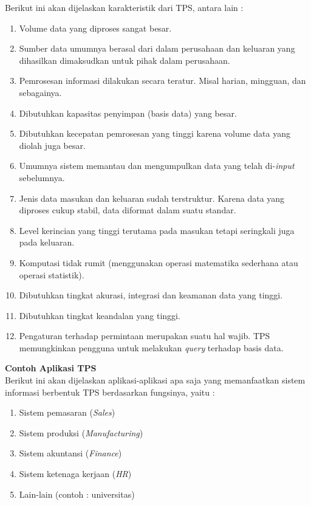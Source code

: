 Berikut ini akan dijelaskan karakteristik dari TPS, antara lain \cite{Turban:2001} : 
\begin{enumerate}
	\item Volume data yang diproses sangat besar.
	\item Sumber data umumnya berasal dari dalam perusahaan dan keluaran yang dihasilkan dimaksudkan untuk pihak dalam perusahaan.
	\item Pemrosesan informasi dilakukan secara teratur. Misal harian, mingguan, dan sebagainya.
	\item Dibutuhkan kapasitas penyimpan (basis data) yang besar.
	\item Dibutuhkan kecepatan pemrosesan yang tinggi karena volume data yang diolah juga besar.
	\item Umumnya sistem memantau dan mengumpulkan data yang telah di-\textit{input} sebelumnya.
	\item Jenis data masukan dan keluaran sudah terstruktur. Karena data yang diproses cukup stabil, data diformat dalam suatu standar.
	\item Level kerincian yang tinggi terutama pada masukan tetapi seringkali juga pada keluaran.
	\item Komputasi tidak rumit (menggunakan operasi matematika sederhana atau operasi statistik).
	\item Dibutuhkan tingkat akurasi, integrasi dan keamanan data yang tinggi.
	\item Dibutuhkan tingkat keandalan yang tinggi.
	\item Pengaturan terhadap permintaan merupakan suatu hal wajib. TPS memungkinkan pengguna untuk melakukan \textit{query} terhadap basis data.
\end{enumerate}

\textbf{Contoh Aplikasi TPS}\\
\label{sec:contoh_aplikasi _tps}
Berikut ini akan dijelaskan aplikasi-aplikasi apa saja yang memanfaatkan sistem informasi berbentuk TPS berdasarkan fungsinya, yaitu \cite{Laudon:1996} :
\begin{enumerate}
	\item Sistem pemasaran (\textit{Sales})
	\item Sistem produksi (\textit{Manufacturing})
	\item Sistem akuntansi (\textit{Finance})
	\item Sistem ketenaga kerjaan (\textit{HR})
	\item Lain-lain (contoh : universitas)
\end{enumerate}

